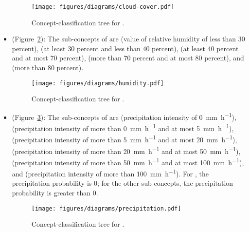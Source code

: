 \begin{itemize}
  \begin{figure}
    \centering
    \texttt{[image: figures/diagrams/cloud-cover.pdf]}
    \caption[Concept-classification tree for ]{Concept-classification tree for .}
    \label{fig:tree_cloud_cover}
  \end{figure}

  \item {} (Figure~\ref{fig:tree_humidity}): The sub-concepts of  are  (value of relative humidity of less than \num{30} percent),  (at least \num{30} percent and less than \num{40} percent),  (at least \num{40} percent and at most \num{70} percent),  (more than \num{70} percent and at most \num{80} percent), and  (more than \num{80} percent).
  
  \begin{figure}
    \centering
    \texttt{[image: figures/diagrams/humidity.pdf]}
    \caption[Concept-classification tree for ]{Concept-classification tree for .}
    \label{fig:tree_humidity}
  \end{figure}

  \item {} (Figure~\ref{fig:tree_precipitation}): The sub-concepts of  are  (precipitation intensity of \SI{0}{\milli\metre\per\hour}),  (precipitation intensity of more than \SI{0}{\milli\metre\per\hour} and at most \SI{5}{\milli\metre\per\hour}),  (precipitation intensity of more than \SI{5}{\milli\metre\per\hour} and at most \SI{20}{\milli\metre\per\hour}),  (precipitation intensity of more than \SI{20}{\milli\metre\per\hour} and at most \SI{50}{\milli\metre\per\hour}),  (precipitation intensity of more than \SI{50}{\milli\metre\per\hour} and at most \SI{100}{\milli\metre\per\hour}), and  (precipitation intensity of more than \SI{100}{\milli\metre\per\hour}). For , the precipitation probability is \num{0}; for the other sub-concepts, the precipitation probability is greater than \num{0}.
  
  \begin{figure}
    \centering
    \texttt{[image: figures/diagrams/precipitation.pdf]}
    \caption[Concept-classification tree for ]{Concept-classification tree for .}
    \label{fig:tree_precipitation}
  \end{figure}
  

\end{itemize}
